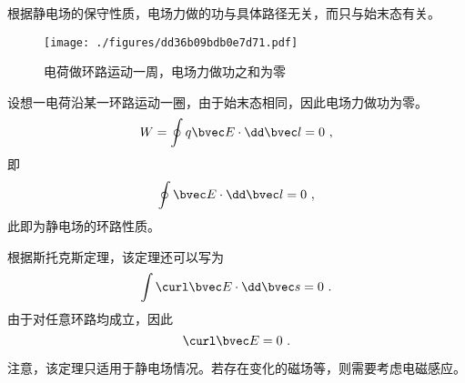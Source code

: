 

根据静电场的保守性质，电场力做的功与具体路径无关，而只与始末态有关。
\begin{figure}[ht]
\centering
\texttt{[image: ./figures/dd36b09bdb0e7d71.pdf]}
\caption{电荷做环路运动一周，电场力做功之和为零} \label{fig_ELECLD_1}
\end{figure}

设想一电荷沿某一环路运动一圈，由于始末态相同，因此电场力做功为零。
$$
W = \oint q\bvec E \cdot \dd \bvec l = 0~,
$$
即
\begin{equation}
\oint \bvec E \cdot \dd \bvec l = 0~,
\end{equation}
此即为静电场的环路性质。

根据斯托克斯定理，该定理还可以写为
$$\int \curl \bvec E \cdot \dd \bvec s = 0~.$$
由于对任意环路均成立，因此
\begin{equation}
\curl \bvec E = 0~.
\end{equation}

注意，该定理只适用于静电场情况。若存在变化的磁场等，则需要考虑电磁感应。